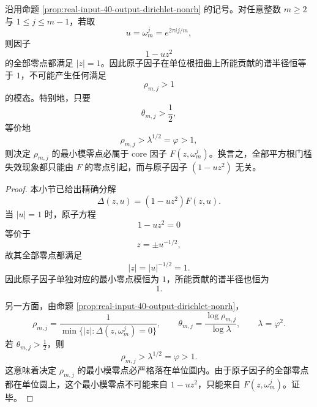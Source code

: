 \begin{theorem}\label{thm:killo-real-input-40-dirichlet-threshold-core-origin}
沿用命题 \ref{prop:real-input-40-output-dirichlet-nonrh} 的记号。对任意整数 \(m\ge 2\) 与 \(1\le j\le m-1\)，若取
\[
u=\omega_m^j=e^{2\pi i j/m},
\]
则因子
\[
1-uz^2
\]
的全部零点都满足 \(|z|=1\)。因此原子因子在单位根扭曲上所能贡献的谱半径恒等于 \(1\)，不可能产生任何满足
\[
\rho_{m,j}>1
\]
的模态。特别地，只要
\[
\theta_{m,j}>\frac12,
\]
等价地
\[
\rho_{m,j}>\lambda^{1/2}=\varphi>1,
\]
则决定 \(\rho_{m,j}\) 的最小模零点必属于 core 因子 \(F(z,\omega_m^j)\)。换言之，全部平方根门槛失效现象都只能由 \(F\) 的零点引起，而与原子因子 \((1-uz^2)\) 无关。
\end{theorem}
\begin{proof}
本小节已给出精确分解
\[
\Delta(z,u)=(1-uz^2)F(z,u).
\]
当 \(|u|=1\) 时，原子方程
\[
1-uz^2=0
\]
等价于
\[
z=\pm u^{-1/2},
\]
故其全部零点都满足
\[
|z|=|u|^{-1/2}=1.
\]
因此原子因子单独对应的最小零点模恒为 \(1\)，所能贡献的谱半径也恒为
\[
1.
\]

另一方面，由命题 \ref{prop:real-input-40-output-dirichlet-nonrh}，
\[
\rho_{m,j}=\frac{1}{\min\{|z|:\Delta(z,\omega_m^j)=0\}},
\qquad
\theta_{m,j}=\frac{\log\rho_{m,j}}{\log\lambda},
\qquad
\lambda=\varphi^2.
\]
若 \(\theta_{m,j}>\frac12\)，则
\[
\rho_{m,j}>\lambda^{1/2}=\varphi>1.
\]
这意味着决定 \(\rho_{m,j}\) 的最小模零点必严格落在单位圆内。由于原子因子的全部零点都在单位圆上，这个最小模零点不可能来自 \(1-uz^2\)，只能来自 \(F(z,\omega_m^j)\)。证毕。
\end{proof}
